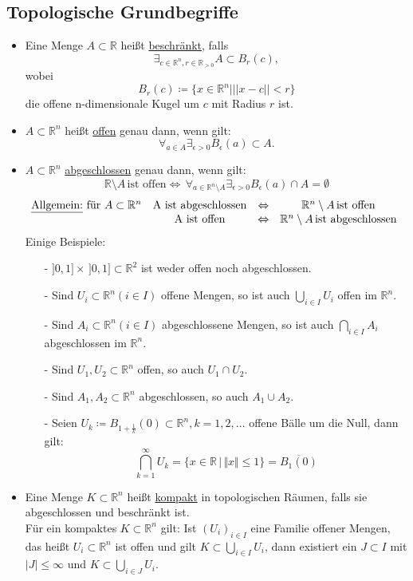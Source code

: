 \subsection{Topologische Grundbegriffe}
\begin{itemize}
	\item Eine Menge $A \subset \mathbb{R}$ heißt \underline{beschränkt}, falls
	\[\exists_{c \in \mathbb{R}^n, r \in \mathbb{R}_{>0}} A \subset B_r(c),\] wobei \[B_r(c)\coloneqq \{x \in \mathbb{R}^n| ||x-c|| < r\}\] die offene n-dimensionale Kugel um $c$ mit Radius $r$ ist.
	\item $A \subset \mathbb{R}^n$ heißt \underline{offen} genau dann, wenn gilt:
	\[\forall_{a \in A} \exists_{\epsilon > 0} B_{\epsilon}(a) \subset A.\]
	\item $A \subset \mathbb{R}^n$ \underline{abgeschlossen} genau dann, wenn gilt:
	\[\mathbb{R} \setminus A \, \textrm{ist offen} \Leftrightarrow \, \forall_{a \in \mathbb{R}^n \setminus A} \exists_{\epsilon > 0} B_{\epsilon}(a) \cap A = \emptyset\]
	\begin{equation*}
		\begin{matrix}
		\textrm{\underline{Allgemein:} für } A \subset \mathbb{R}^n & \textrm{A ist abgeschlossen} & \Leftrightarrow & \mathbb{R}^n \setminus A \, \textrm{ist offen}\\
		& \textrm{A ist offen} & \Leftrightarrow & \mathbb{R}^n \setminus A \, \textrm{ist abgeschlossen}
		\end{matrix}\\
	\end{equation*}
	Einige Beispiele:
	\begin{itemize}
		\item[-] $]0,1] \times \,]0,1] \subset \mathbb{R}^2$ ist weder offen noch abgeschlossen.
		\item[-] Sind $U_i \subset \mathbb{R}^n (i \in I)$ offene Mengen, so ist auch $\bigcup_{i \in I} U_i$ offen im $\mathbb{R}^n$.
		\item[-] Sind $A_i \subset \mathbb{R}^n (i \in I)$ abgeschlossene Mengen, so ist auch $\bigcap_{i \in I} A_i$ abgeschlossen im $\mathbb{R}^n$.
		\item[-] Sind $U_1, U_2 \subset \mathbb{R}^n$ offen, so auch $U_1 \cap U_2$.
		\item[-] Sind $A_1, A_2 \subset \mathbb{R}^n$ abgeschlossen, so auch $A_1 \cup A_2$.
		\item[-] Seien $U_k\coloneqq B_{1+\frac{1}{k}} (0) \subset \mathbb{R}^n, k=1,2,...$ offene Bälle um die Null, dann gilt:
		\[\bigcap_{k=1}^\infty U_k = \{x \in \mathbb{R}\, |\, \Vert x\Vert \leq 1\} = \overline{B_1(0)}\]
	\end{itemize}
	\item Eine Menge $K \subset \mathbb{R}^n$ heißt \underline{kompakt} in topologischen Räumen, falls sie abgeschlossen und beschränkt ist.\\
	Für  ein kompaktes $K \subset \mathbb{R}^n$ gilt: Ist $(U_i)_{i \in I}$ eine Familie offener Mengen, das heißt $U_i \subset \mathbb{R}^n$ ist offen und gilt $K \subset \bigcup_{i \in I} U_i$, dann existiert ein $J \subset I$ mit $|J| \le \infty$ und $K \subset \bigcup_{i \in J} U_i$.\\
	

\end{itemize}
